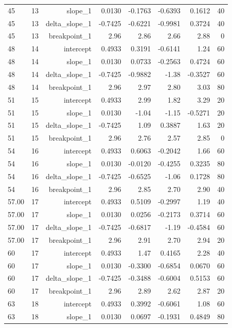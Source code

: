 {\begin{longtable}{lrrrrrrr}
  45 & 13 & slope\_1 & 0.0130 & -0.1763 & -0.6393 & 0.1612 & 40 \\
  45 & 13 & delta\_slope\_1 & -0.7425 & -0.6221 & -0.9981 & 0.3724 & 40 \\
  45 & 13 & breakpoint\_1 & 2.96 & 2.86 & 2.66 & 2.88 & 0 \\
  48 & 14 & intercept & 0.4933 & 0.3191 & -0.6141 & 1.24 & 60 \\
  48 & 14 & slope\_1 & 0.0130 & 0.0733 & -0.2563 & 0.4724 & 60 \\
  48 & 14 & delta\_slope\_1 & -0.7425 & -0.9882 & -1.38 & -0.3527 & 60 \\
  48 & 14 & breakpoint\_1 & 2.96 & 2.97 & 2.80 & 3.03 & 80 \\
  51 & 15 & intercept & 0.4933 & 2.99 & 1.82 & 3.29 & 20 \\
  51 & 15 & slope\_1 & 0.0130 & -1.04 & -1.15 & -0.5271 & 20 \\
  51 & 15 & delta\_slope\_1 & -0.7425 & 1.09 & 0.3887 & 1.63 & 20 \\
  51 & 15 & breakpoint\_1 & 2.96 & 2.76 & 2.57 & 2.85 & 0 \\
  54 & 16 & intercept & 0.4933 & 0.6063 & -0.2042 & 1.66 & 60 \\
  54 & 16 & slope\_1 & 0.0130 & -0.0120 & -0.4255 & 0.3235 & 80 \\
  54 & 16 & delta\_slope\_1 & -0.7425 & -0.6525 & -1.06 & 0.1728 & 80 \\
  54 & 16 & breakpoint\_1 & 2.96 & 2.85 & 2.70 & 2.90 & 40 \\
  57.00 & 17 & intercept & 0.4933 & 0.5109 & -0.2997 & 1.19 & 40 \\
  57.00 & 17 & slope\_1 & 0.0130 & 0.0256 & -0.2173 & 0.3714 & 60 \\
  57.00 & 17 & delta\_slope\_1 & -0.7425 & -0.6817 & -1.19 & -0.4584 & 60 \\
  57.00 & 17 & breakpoint\_1 & 2.96 & 2.91 & 2.70 & 2.94 & 20 \\
  60 & 17 & intercept & 0.4933 & 1.47 & 0.4165 & 2.28 & 40 \\
  60 & 17 & slope\_1 & 0.0130 & -0.3300 & -0.6854 & 0.0670 & 60 \\
  60 & 17 & delta\_slope\_1 & -0.7425 & -0.3488 & -0.6004 & 0.5153 & 60 \\
  60 & 17 & breakpoint\_1 & 2.96 & 2.89 & 2.62 & 2.87 & 20 \\
  63 & 18 & intercept & 0.4933 & 0.3992 & -0.6061 & 1.08 & 60 \\
  63 & 18 & slope\_1 & 0.0130 & 0.0697 & -0.1931 & 0.4849 & 80 \\

\end{longtable}}
